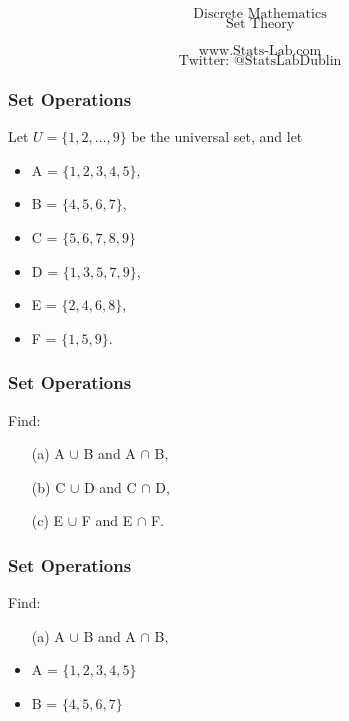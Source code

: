 \documentclass{beamer}
\begin{document}
	\begin{frame}
		\Huge
		\[\mbox{Discrete Mathematics}\]
		\Huge
		\[\mbox{Set Theory}\]
		
		\Large
		\[\mbox{www.Stats-Lab.com}\]
		\Large
		\[\mbox{Twitter: @StatsLabDublin}\]
		
	\end{frame}
	\begin{frame}
		\Large
		\frametitle{Set Operations}
		Let $U = \{1,2,\ldots, 9\}$ be the universal set, and let
		\begin{itemize}
			\item A = $\{1, 2, 3, 4, 5\}$,  
			\item B = $\{4, 5, 6, 7\}$,  
			\item C = $\{5, 6, 7, 8, 9\}$
			\item D = $\{1, 3, 5, 7, 9\}$,
			\item E = $\{2, 4, 6, 8\}$,
			\item F = $\{1, 5, 9\}$.
		\end{itemize}
	\end{frame}
	\begin{frame}
		\frametitle{Set Operations}
		\Large
		\vspace{-3cm}
		Find: 
		\begin{itemize}
			\item[(a)] A $\cup$ B and A $\cap$ B, 
			\item[(b)] C $\cup$ D and C $\cap$ D, 
			\item[(c)] E $\cup$ F and E $\cap$ F.
		\end{itemize}
		
	\end{frame}
	\begin{frame}
		\frametitle{Set Operations}
		\Large
		\vspace{-3cm}
		Find: 
		\begin{itemize}
			\item[(a)] A $\cup$ B and A $\cap$ B, \bigskip
			\item A = $\{1, 2, 3, 4, 5\}$  
			\item B = $\{4, 5, 6, 7\}$  
		\end{itemize}
		
	\end{frame}
\end{document}
